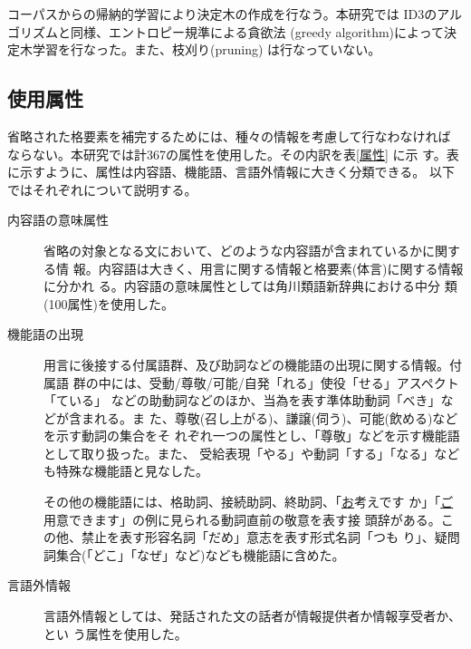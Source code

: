 コーパスからの帰納的学習により決定木の作成を行なう。本研究では
ID3\cite{Quinlan}のアルゴリズムと同様、エントロピー規準による貪欲法
(greedy algorithm)によって決定木学習を行なった。また、枝刈り(pruning)
は行なっていない。



\subsection{使用属性}
\label{使用属性}

省略された格要素を補完するためには、種々の情報を考慮して行なわなければ
ならない。本研究では計367の属性を使用した。その内訳を表\ref{属性} に示
す。表に示すように、属性は内容語、機能語、言語外情報に大きく分類できる。
以下ではそれぞれについて説明する。


\begin{description}
\item[内容語の意味属性]

省略の対象となる文において、どのような内容語が含まれているかに関する情
報。内容語は大きく、用言に関する情報と格要素(体言)に関する情報に分かれ
る。内容語の意味属性としては角川類語新辞典\cite{角川類語}における中分
類(100属性)を使用した。


\item[機能語の出現]

用言に後接する付属語群、及び助詞などの機能語の出現に関する情報。付属語
群の中には、受動/尊敬/可能/自発「れる」使役「せる」アスペクト「ている」
などの助動詞などのほか、当為を表す準体助動詞「べき」などが含まれる。ま
た、尊敬(召し上がる)、謙譲(伺う)、可能(飲める)などを示す動詞の集合をそ
れぞれ一つの属性とし、「尊敬」などを示す機能語として取り扱った。また、
受給表現「やる」や動詞「する」「なる」なども特殊な機能語と見なした。

その他の機能語には、格助詞、接続助詞、終助詞、「\underline{お}考えです
か」「\underline{ご}用意できます」の例に見られる動詞直前の敬意を表す接
頭辞がある。この他、禁止を表す形容名詞「だめ」意志を表す形式名詞「つも
り」、疑問詞集合(「どこ」「なぜ」など)なども機能語に含めた。


\item[言語外情報]

言語外情報としては、発話された文の話者が情報提供者か情報享受者か、とい
う属性を使用した。

\end{description}


